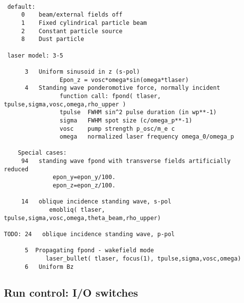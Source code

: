 \documentclass[12pt,psfig]{article}
\begin{document}
\begin{verbatim}

 default:  
     0    beam/external fields off
     1    Fixed cylindrical particle beam
     2    Constant particle source
     8    Dust particle

 laser model: 3-5

      3   Uniform sinusoid in z (s-pol)
                Epon_z = vosc*omega*sin(omega*tlaser)
      4   Standing wave ponderomotive force, normally incident
                function call: fpond( tlaser, tpulse,sigma,vosc,omega,rho_upper )
                tpulse  FWHM sin^2 pulse duration (in wp**-1)
                sigma   FWHM spot size (c/omega_p**-1)
                vosc    pump strength p_osc/m_e c
                omega   normalized laser frequency omega_0/omega_p
 
    Special cases:
     94   standing wave fpond with transverse fields artificially reduced
              epon_y=epon_y/100.
              epon_z=epon_z/100.

     14   oblique incidence standing wave, s-pol
             emobliq( tlaser, tpulse,sigma,vosc,omega,theta_beam,rho_upper)

TODO: 24   oblique incidence standing wave, p-pol

      5  Propagating fpond - wakefield mode
            laser_bullet( tlaser, focus(1), tpulse,sigma,vosc,omega)
      6   Uniform Bz

\end{verbatim}

\subsection{Run control: I/O switches}
\end{document}

